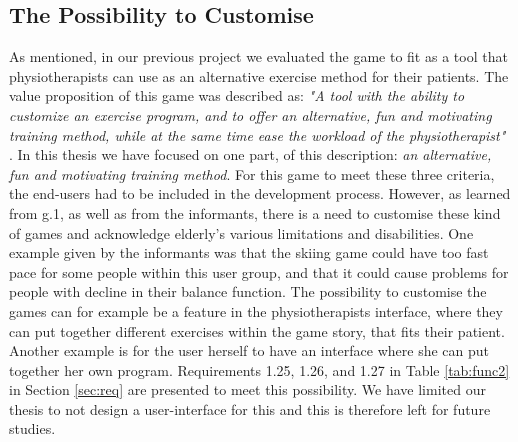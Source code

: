 \subsection{The Possibility to Customise}
As mentioned, in our previous project \cite{project} we evaluated the game to fit as a tool that physiotherapists can use as an alternative exercise method for their patients. The value proposition of this game was described as: \emph{"A tool with the ability to customize an exercise program, and to offer an alternative, fun and motivating training method, while at the same time ease the workload of the physiotherapist"} \cite{project}. In this thesis we have focused on one part, of this description: \emph{an alternative, fun and motivating training method}. For this game to meet these three criteria, the end-users had to be included in the development process. However, as learned from g.1, as well as from the informants, there is a need to customise these kind of games and acknowledge elderly's various limitations and disabilities. One example given by the informants was that the skiing game could have too fast pace for some people within this user group, and that it could cause problems for people with decline in their balance function. The possibility to customise the games can for example be a feature in the physiotherapists interface, where they can put together different exercises within the game story, that fits their patient. Another example is for the user herself to have an interface where she can put together her own program.  Requirements 1.25, 1.26, and 1.27 in Table \ref{tab:func2} in Section \ref{sec:req} are presented to meet this possibility. We have limited our thesis to not design a user-interface for this and this is therefore left for future studies. 

